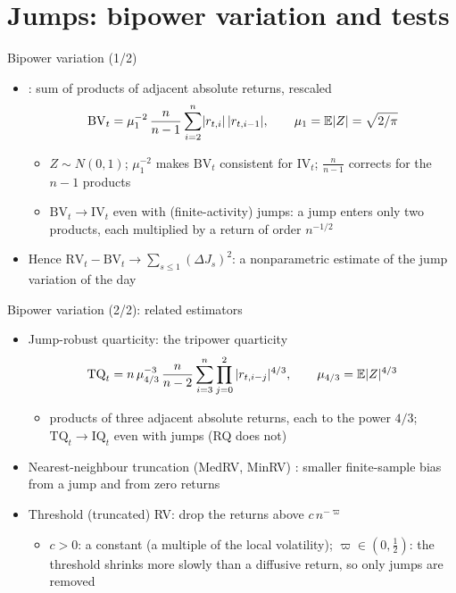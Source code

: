 \section{Jumps: bipower variation and tests}

\begin{frame}{Bipower variation (1/2)}
\itemsize{\small}
\begin{itemize}
    \item {}: sum of products of adjacent absolute returns, rescaled
    \[ \mathrm{BV}_t = \mu_1^{-2}\,\frac{n}{n-1}\sum_{i=2}^n\lvert r_{t,i}\rvert\,\lvert r_{t,i-1}\rvert, \qquad \mu_1 = \mathbb{E}|Z| = \sqrt{2/\pi} \]
    \begin{itemize}
        \item $Z \sim N(0, 1)$; $\mu_1^{-2}$ makes $\mathrm{BV}_t$ consistent for $\mathrm{IV}_t$; $\frac{n}{n-1}$ corrects for the $n-1$ products
        \item $\mathrm{BV}_t \to \mathrm{IV}_t$ even with (finite-activity) jumps: a jump enters only two products, each multiplied by a return of order $n^{-1/2}$
    \end{itemize}
    \item Hence $\mathrm{RV}_t - \mathrm{BV}_t \to \sum_{s \le 1}(\Delta J_s)^2$: a nonparametric estimate of the jump variation of the day
\end{itemize}
\end{frame}

\begin{frame}{Bipower variation (2/2): related estimators}
\itemsize{\small}
\begin{itemize}
    \item Jump-robust quarticity: the tripower quarticity
    \[ \mathrm{TQ}_t = n\,\mu_{4/3}^{-3}\,\frac{n}{n-2}\sum_{i=3}^n\prod_{j=0}^2|r_{t,i-j}|^{4/3}, \qquad \mu_{4/3} = \mathbb{E}|Z|^{4/3} \]
    \begin{itemize}
        \item products of three adjacent absolute returns, each to the power $4/3$; $\mathrm{TQ}_t \to \mathrm{IQ}_t$ even with jumps (RQ does not)
    \end{itemize}
    \item Nearest-neighbour truncation (MedRV, MinRV) : smaller finite-sample bias from a jump and from zero returns
    \item Threshold (truncated) RV: drop the returns above $c\,n^{-\varpi}$
    \begin{itemize}
        \item $c > 0$: a constant (a multiple of the local volatility); $\varpi \in (0, \frac12)$: the threshold shrinks more slowly than a diffusive return, so only jumps are removed
    \end{itemize}
\end{itemize}
\end{frame}

